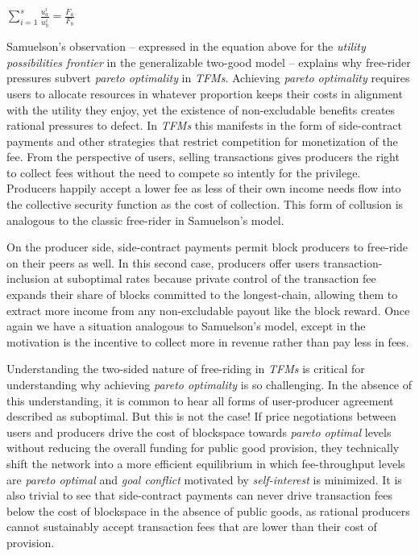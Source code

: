 \LARGE
\begin{adjustwidth}{1.5em}{1.5em}
\begin{math}
\sum_{i=1}^{s} \frac{u_a^i}{u_b^i} = \frac{F_a}{F_b}
\end{math}
\end{adjustwidth}
\normalsize

Samuelson's observation -- expressed in the equation above for the \textit{utility possibilities frontier} in the generalizable two-good model -- explains why free-rider pressures subvert \textit{pareto optimality} in \textit{TFMs}. Achieving \textit{pareto optimality} requires users to allocate resources in whatever proportion keeps their costs in alignment with the utility they enjoy, yet the existence of non-excludable benefits creates rational pressures to defect. In \textit{TFMs} this manifests in the form of side-contract payments and other strategies that restrict competition for monetization of the fee. From the perspective of users, selling transactions gives producers the right to collect fees without the need to compete so intently for the privilege. Producers happily accept a lower fee as less of their own income needs flow into the collective security function as the cost of collection. This form of collusion is analogous to the classic free-rider in Samuelson's model.

On the producer side, side-contract payments permit block producers to free-ride on their peers as well. In this second case, producers offer users transaction-inclusion at suboptimal rates because private control of the transaction fee expands their share of blocks committed to the longest-chain, allowing them to extract more income from any non-excludable payout like the block reward. Once again we have a situation analogous to Samuelson's model, except in the motivation is the incentive to collect more in revenue rather than pay less in fees.

Understanding the two-sided nature of free-riding in \textit{TFMs} is critical for understanding why achieving \textit{pareto optimality} is so challenging. In the absence of this understanding, it is common to hear all forms of user-producer agreement described as suboptimal. But this is not the case! If price negotiations between users and producers drive the cost of blockspace towards \textit{pareto optimal} levels without reducing the overall funding for public good provision, they technically shift the network into a more efficient equilibrium in which fee-throughput levels are \textit{pareto optimal} and \textit{goal conflict} motivated by \textit{self-interest} is minimized. It is also trivial to see that side-contract payments can never drive transaction fees below the cost of blockspace in the absence of public goods, as rational producers cannot sustainably accept transaction fees that are lower than their cost of provision.

